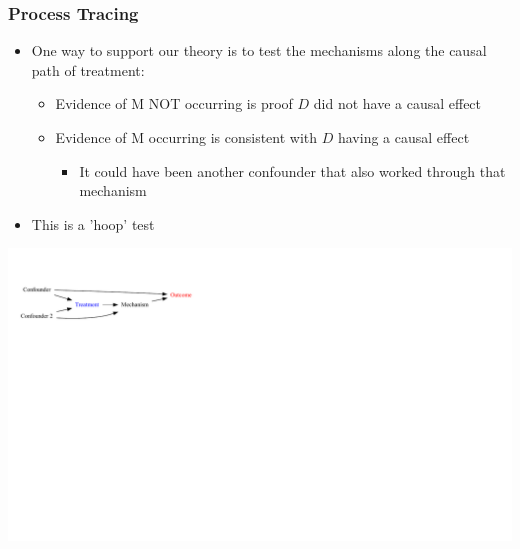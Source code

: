 \documentclass[xcolor=x11names,compress]{beamer}\usepackage[]{graphicx}\usepackage[]{color}
\newenvironment{knitrout}{}{} %
\renewcommand{\(}{\begin{columns}}
\renewcommand{\)}{\end{columns}}
\newcommand{\<}[1]{\begin{column}{#1}}
\renewcommand{\>}{\end{column}}
\begin{document}
\begin{frame}
\frametitle{Process Tracing}
\begin{itemize}
\item One way to support our theory is to test the mechanisms along the causal path of treatment:
\begin{itemize}
\item Evidence of M NOT occurring is proof $D$ did not have a causal effect
\item Evidence of M occurring is consistent with $D$ having a causal effect
\begin{itemize}
\item It could have been another confounder that also worked through that mechanism
\end{itemize}
\end{itemize}
\item This is a 'hoop' test
\end{itemize}
\begin{knitrout}
\color{fgcolor}
\includegraphics[width=1.8\linewidth]{figure/Dag3-1} 

\end{knitrout}
\end{frame}
\end{document}
